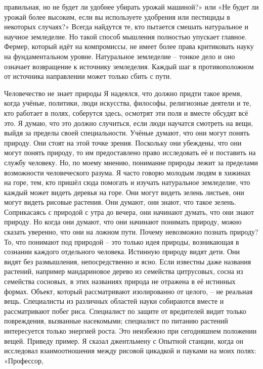 \documentclass[a4paper]{book}
\begin{document}
правильная, но не будет ли удобнее убирать урожай машиной?» или «Не будет ли урожай
более высоким, если вы используете удобрения или пестициды в некоторых случаях?»
Всегда найдутся те, кто пытается смешать натуральное и научное земледелие. Но такой
способ мышления полностью упускает главное. Фермер, который идёт на компромиссы, не
имеет более права критиковать науку на фундаментальном уровне.
Натуральное земледелие – тонкое дело и оно означает возвращение к источнику
земледелия. Каждый шаг в противоположном от источника направлении может только сбить
с пути.

Человечество не знает природы
Я надеялся, что должно придти такое время, когда учёные, политики, люди искусства,
философы, религиозные деятели и те, кто работает в полях, соберутся здесь, осмотрят эти
поля и вместе обсудят всё это. Я думаю, что это должно случиться, если люди научатся
смотреть на вещи, выйдя за пределы своей специальности.
Учёные думают, что они могут понять природу. Они стоят на этой точке зрения.
Поскольку они убеждены, что они могут понять природу, то им предоставлено право
исследовать её и поставить на службу человеку. Но, по моему мнению, понимание природы
лежит за пределами возможности человеческого разума.
Я часто говорю молодым людям в хижинах на горе, тем, кто пришёл сюда помогать и
изучать натуральное земледелие, что каждый может видеть деревья на горе. Они могут
видеть зелень листьев, они могут видеть рисовые растения. Они думают, они знают, что
такое зелень. Соприкасаясь с природой с утра до вечера, они начинают думать, что они
знают природу. Но когда они думают, что они начинают понимать природу, можно сказать
уверенно, что они на ложном пути.
Почему невозможно познать природу? То, что понимают под природой – это только идея
природы, возникающая в сознании каждого отдельного человека. Истинную природу видят
дети. Они видят без размышления, непосредственно и ясно. Если известны даже названия
растений, например мандариновое дерево из семейства цитрусовых, сосна из семейства
сосновых, в этих названиях природа не отражена в её истинных формах.
Объект, который рассматривают изолированно от целого, – не реальная вещь.
Специалисты из различных областей науки собираются вместе и рассматривают побег
риса. Специалист по защите от вредителей видит только повреждения, вызванные
насекомыми; специалист по питанию растений интересуется только энергией роста. Это
неизбежно при сегодняшнем положении вещей.
Приведу пример. Я сказал джентльмену с Опытной станции, когда он исследовал
взаимоотношения между рисовой цикадкой и пауками на моих полях: «Профессор,
\end{document}
